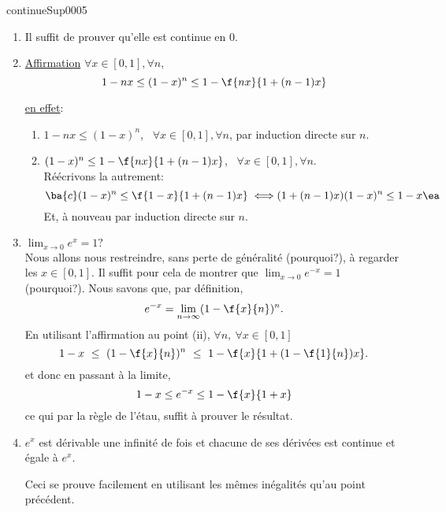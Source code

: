 
\begin{corrige}{continueSup0005}


\begin{enumerate}
\item Il suffit de prouver qu'elle est continue en $0$.
\item%
\underline{Affirmation} $\forall  x \in [0,1], \forall n$,  \[1-nx\leq(1-x)^n\leq 1 - \f{nx}{1+(n-1)x}\]

\underline{en effet}: 
\begin{enumerate}
\item $1-nx\leq(1-x)^n$, \ $\forall  x \in [0,1], \forall n$, par induction  directe sur $n$.
\item $(1-x)^n\leq 1 - \f{nx}{1+(n-1)x}$, \ $\forall  x \in [0,1], \forall n$.\\
Réécrivons la autrement: 
\[ \ba{c}  (1-x)^n \leq  \f{1-x}{1+(n-1)x} \\  \iff \\ (1+(n-1)x)(1-x)^n\leq 1-x\ea\]
Et, à nouveau par induction directe sur $n$.

\end{enumerate}

\item $\lim_{x\rightarrow 0}e^x=1?$\\ Nous allons nous restreindre, sans perte de généralité (pourquoi?),  à regarder les $x\in [0,1]$. Il suffit pour cela de montrer que $\lim_{x\rightarrow 0}e^{-x}=1$ (pourquoi?).
Nous savons que, par définition,  \[e^{-x} = \lim_{n\rightarrow 	\infty}(1-\f{x}{n})^n.\] 
En utilisant l'affirmation au point (ii),  $\forall n, \ \forall x\in [0,1]$
\[ 1-x \  \leq \ (1-\f{x}{n})^n \ \leq \  1-\f{x}{1+(1-\f{1}{n})x}. \]
 et donc en passant à la limite,
\[1-x \leq e^{-x} \leq 1-\f{x}{1+x}\]
ce qui par la règle de l'étau, suffit à prouver le résultat. 
\item $e^x$ est dérivable une infinité de fois et chacune de ses dérivées est continue et égale à $e^x$.

Ceci se prouve  facilement en utilisant les mêmes inégalités qu'au point précédent.
\end{enumerate}

\end{corrige}
